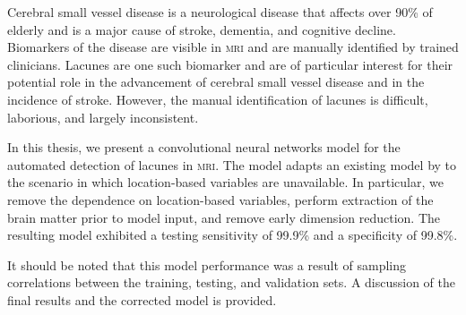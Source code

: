\afterpage{\cleardoublepage}



Cerebral small vessel disease is a neurological disease that affects over 90\% of elderly and is a major cause of stroke, dementia, and cognitive decline. Biomarkers of the disease are visible in \textsc{mri} and are manually identified by trained clinicians. Lacunes are one such biomarker and are of particular interest for their potential role in the advancement of cerebral small vessel disease and in the incidence of stroke. However, the manual identification of lacunes is difficult, laborious, and largely inconsistent.

In this thesis, we present a convolutional neural networks model for the automated detection of lacunes in \textsc{mri}. The model adapts an existing model by \cite{GhafoorianM.2017Dml3} to the scenario in which location-based variables are unavailable. In particular, we remove the dependence on location-based variables, perform extraction of the brain matter prior to model input, and remove early dimension reduction. The resulting model exhibited a testing sensitivity of 99.9\% and a specificity of 99.8\%.

It should be noted that this model performance was a result of sampling correlations between the training, testing, and validation sets. A discussion of the final results and the corrected model is provided.

